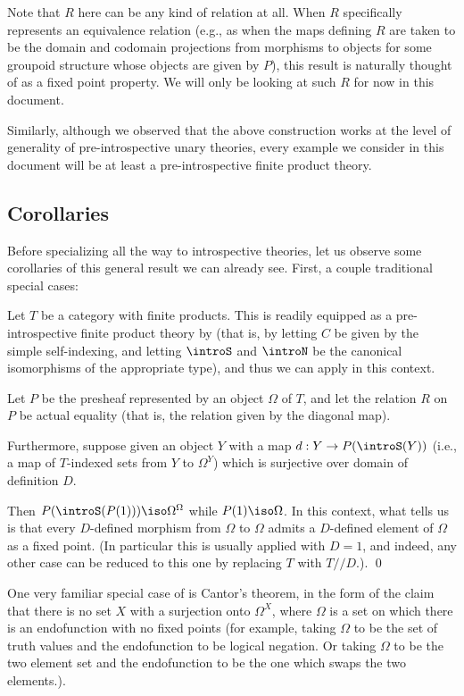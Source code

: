 Note that $R$ here can be any kind of relation at all. When $R$ specifically represents an equivalence relation (e.g., as when the maps defining $R$ are taken to be the domain and codomain projections from morphisms to objects for some groupoid structure whose objects are given by $P$), this result is naturally thought of as a fixed point property. We will only be looking at such $R$ for now in this document.

Similarly, although we observed that the above construction works at the level of generality of pre-introspective unary theories, every example we consider in this document will be at least a pre-introspective finite product theory.

\subsection{Corollaries}
Before specializing all the way to introspective theories, let us observe some corollaries of this general result we can already see. First, a couple traditional special cases:

\label{LawveresTheoremViaPreIntrospective}
Let $T$ be a category with finite products. This is readily equipped as a pre-introspective finite product theory by  (that is, by letting $C$ be given by the simple self-indexing, and letting $\introS$ and $\introN$ be the canonical isomorphisms of the appropriate type), and thus we can apply  in this context.

Let $P$ be the presheaf represented by an object $\Omega$ of $T$, and let the relation $R$ on $P$ be actual equality (that is, the relation given by the diagonal map). 

Furthermore, suppose given an object $Y$ with a map $d : Y \to P(\introS(Y))$ (i.e., a map of $T$-indexed sets from $Y$ to $\Omega^Y$) which is surjective over domain of definition $D$.

Then $P(\introS(P(1))) \iso \Omega^{\Omega}$ while $P(1) \iso \Omega$. In this context, what  tells us is that every $D$-defined morphism from $\Omega$ to $\Omega$ admits a $D$-defined element of $\Omega$ as a fixed point. (In particular this is usually applied with $D = 1$, and indeed, any other case can be reduced to this one by replacing $T$ with $T//D$.). \qed
{}

\label{CantorsTheorem}
One very familiar special case of  is Cantor's theorem, in the form of the claim that there is no set $X$ with a surjection onto $\Omega^X$, where $\Omega$ is a set on which there is an endofunction with no fixed points (for example, taking $\Omega$ to be the set of truth values and the endofunction to be logical negation. Or taking $\Omega$ to be the two element set and the endofunction to be the one which swaps the two elements.).


